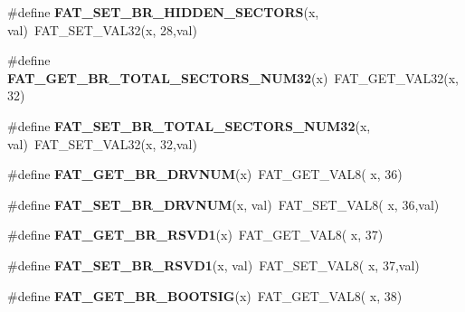 \begin{DoxyCompactItemize}
\item 
\mbox{\label{group__libfs__dosfs_ga399ba010df43291d1ebb049820c9b16e}} 
\#define {\bfseries F\+A\+T\+\_\+\+S\+E\+T\+\_\+\+B\+R\+\_\+\+H\+I\+D\+D\+E\+N\+\_\+\+S\+E\+C\+T\+O\+RS}(x,  val)~F\+A\+T\+\_\+\+S\+E\+T\+\_\+\+V\+A\+L32(x, 28,val)
\item 
\mbox{\label{group__libfs__dosfs_gabc650ac299df8b6e3430a94b85b1fb28}} 
\#define {\bfseries F\+A\+T\+\_\+\+G\+E\+T\+\_\+\+B\+R\+\_\+\+T\+O\+T\+A\+L\+\_\+\+S\+E\+C\+T\+O\+R\+S\+\_\+\+N\+U\+M32}(x)~F\+A\+T\+\_\+\+G\+E\+T\+\_\+\+V\+A\+L32(x, 32)
\item 
\mbox{\label{group__libfs__dosfs_gab596185dbb9976ba5fd4960858eec6bb}} 
\#define {\bfseries F\+A\+T\+\_\+\+S\+E\+T\+\_\+\+B\+R\+\_\+\+T\+O\+T\+A\+L\+\_\+\+S\+E\+C\+T\+O\+R\+S\+\_\+\+N\+U\+M32}(x,  val)~F\+A\+T\+\_\+\+S\+E\+T\+\_\+\+V\+A\+L32(x, 32,val)
\item 
\mbox{\label{group__libfs__dosfs_gaeb305022bbc9f2cd47edcf43cc4402e5}} 
\#define {\bfseries F\+A\+T\+\_\+\+G\+E\+T\+\_\+\+B\+R\+\_\+\+D\+R\+V\+N\+UM}(x)~F\+A\+T\+\_\+\+G\+E\+T\+\_\+\+V\+A\+L8( x, 36)
\item 
\mbox{\label{group__libfs__dosfs_gaf1ef72992d36a2d455d60205a220cf06}} 
\#define {\bfseries F\+A\+T\+\_\+\+S\+E\+T\+\_\+\+B\+R\+\_\+\+D\+R\+V\+N\+UM}(x,  val)~F\+A\+T\+\_\+\+S\+E\+T\+\_\+\+V\+A\+L8( x, 36,val)
\item 
\mbox{\label{group__libfs__dosfs_gab1db55806df8d736a1a6e5a340ffe563}} 
\#define {\bfseries F\+A\+T\+\_\+\+G\+E\+T\+\_\+\+B\+R\+\_\+\+R\+S\+V\+D1}(x)~F\+A\+T\+\_\+\+G\+E\+T\+\_\+\+V\+A\+L8( x, 37)
\item 
\mbox{\label{group__libfs__dosfs_ga6735fb3c88d34e78e335db22d146c400}} 
\#define {\bfseries F\+A\+T\+\_\+\+S\+E\+T\+\_\+\+B\+R\+\_\+\+R\+S\+V\+D1}(x,  val)~F\+A\+T\+\_\+\+S\+E\+T\+\_\+\+V\+A\+L8( x, 37,val)
\item 
\mbox{\label{group__libfs__dosfs_ga67c27e439c472939a54585751a86392b}} 
\#define {\bfseries F\+A\+T\+\_\+\+G\+E\+T\+\_\+\+B\+R\+\_\+\+B\+O\+O\+T\+S\+IG}(x)~F\+A\+T\+\_\+\+G\+E\+T\+\_\+\+V\+A\+L8( x, 38)

\end{DoxyCompactItemize}
